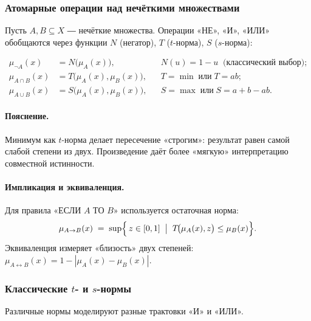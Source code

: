 \subsubsection{Атомарные операции над нечёткими множествами}

Пусть $A,B\subseteq X$ ― нечёткие множества.
Операции «НЕ», «И», «ИЛИ» обобщаются через функции
$N$ (негатор), $T$ ($t$-норма), $S$ ($s$-норма):

\begin{align}
  \mu_{\neg A}(x) &= N\!\bigl(\mu_A(x)\bigr), 
    && N(u)=1-u \;\;\text{(классический выбор);}   \label{eq:neg} \\[-0.5em]
  \mu_{A\cap B}(x) &= T\!\bigl(\mu_A(x),\mu_B(x)\bigr), 
    && T=\min\;\text{или}\;T=ab;                     \\[-0.5em]
  \mu_{A\cup B}(x) &= S\!\bigl(\mu_A(x),\mu_B(x)\bigr), 
    && S=\max\;\text{или}\;S=a+b-ab.                
\end{align}

\noindent
\paragraph{Пояснение.}  
Минимум как $t$-норма делает пересечение «строгим»:
результат равен самой слабой степени из двух.
Произведение даёт более «мягкую» интерпретацию
совместной истинности.

\vspace{0.5em}
\noindent
\paragraph{Импликация и эквиваленция.}
Для правила «ЕСЛИ $A$ ТО $B$» используется остаточная норма:
\begin{equation}
  \mu_{A\to B}(x)
  \;=\;
  \sup\Bigl\{\,z\in[0,1]\;\bigm|\;
       T\!\bigl(\mu_A(x),z\bigr)\le \mu_B(x)\Bigr\}.
\end{equation}
Эквиваленция измеряет «близость» двух степеней:
\(
  \mu_{A\leftrightarrow B}(x)=1-|\mu_A(x)-\mu_B(x)|.
\)

\subsubsection{Классические $t$- и $s$-нормы}

Различные нормы моделируют разные трактовки «И» и «ИЛИ».

